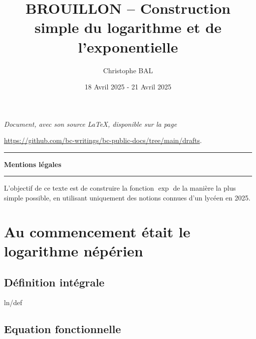 \documentclass[12pt]{amsart}
\begin{document}
\title{BROUILLON -- Construction simple du logarithme et de l'exponentielle}
\author{Christophe BAL}
\date{18 Avril 2025 - 21 Avril 2025}

\maketitle

\begin{center}
	\itshape
	Document, avec son source \LaTeX, disponible sur la page

	\url{https://github.com/bc-writings/bc-public-docs/tree/main/drafts}.
\end{center}


\bigskip


\begin{center}
	\hrule\vspace{.3em}
	{
		\fontsize{1.35em}{1em}\selectfont
		\textbf{Mentions \og légales \fg}
	}

	\vspace{0.45em}
	\doclicenseThis
	\hrule
\end{center}


\bigskip


\setcounter{tocdepth}{2}
\tableofcontents




\newpage

\begin{meta-abstract*}
	L’objectif de ce texte est de construire la fonction $\exp$ de la manière la plus simple possible, en utilisant uniquement des notions connues d'un lycéen en 2025.
\end{meta-abstract*}




\section{Au commencement était le logarithme népérien}

	\subsection{Définition intégrale}

	{ln/def}


	\subsection{Equation fonctionnelle}
\end{document}
